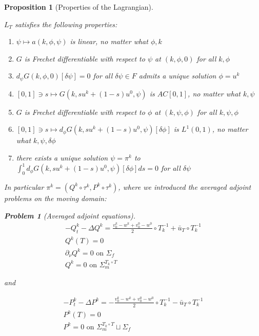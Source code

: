 \documentclass[english,a4paper,10pt,oneside]{scrbook}	%
\theoremstyle{break}
\newtheorem{prop}[equation]{Proposition}
\newtheorem{pb}[equation]{Problem}
\theoremstyle{remark}
\newcommand{\ds}{\displaystyle}
\begin{document}
\begin{prop}[Properties of the Lagrangian]
\label{prop:lagr}

$L_T$ satisfies the following properties:

\begin{enumerate}
	\item $\psi \mapsto a(k, \phi,\psi)$ is linear, no matter what $\phi,k$
	\item $G$ is Frechet differentiable with respect to $\psi$ at $(k,\phi,0)$ for all $k, \phi$
	\item $d_\psi G(k,\phi,0)[\delta \psi]=0$ for all $\delta \psi \in F$ admits a unique solution $\phi = u^k$
	\item $[0,1]\ni s \mapsto G(k, su^k + (1-s)u^0,\psi)$ is $AC[0,1]$, no matter what $k, \psi$
	\item $G$ is Frechet differentiable with respect to $\phi$ at $(k,\psi,\phi)$ for all $k, \psi, \phi$
	\item $[0,1]\ni s \mapsto d_\phi G(k, su^k + (1-s)u^0,\psi)[\delta \phi]$ is $L^1(0,1)$, no matter what $k, \psi, \delta \phi$
	\item there exists a unique solution $\psi = \pi^k$ to $\ds \int_0^1 d_\phi G(k, su^k + (1-s)u^0,\psi)[\delta \phi]ds =0$ for all $\delta \psi$ 
\end{enumerate}

In particular $\pi^k = (Q^k \circ \tau^k,P^k \circ \tau^k)$, where we introduced the averaged adjoint problems on the moving domain:

\begin{pb}[Averaged adjoint equations]
\label{pb:avg_adj_pb}
\begin{align*}
-Q^k_t-\Delta Q^k =\frac{v_0^k-w^k+v_0^0-w^0}{2}\circ T_k^{-1}+\bar{u}_T\circ T_k^{-1} \\
Q^k(T)=0\\
\partial_\nu Q^k = 0 \text{ on } \Sigma_f\\
Q^k = 0 \text{ on } \Sigma_m^{T_k\circ T}
\end{align*}

and

\begin{align*}
-P^k_t-\Delta P^k =-\frac{v_0^k-w^k+v_0^0-w^0}{2}\circ T_k^{-1}-\bar{u}_T\circ T_k^{-1} \\
P^k(T)=0\\
P^k = 0 \text{ on } \Sigma_m^{T_k\circ T} \sqcup \Sigma_f
\end{align*}
\end{pb}

\end{prop}
\end{document}
